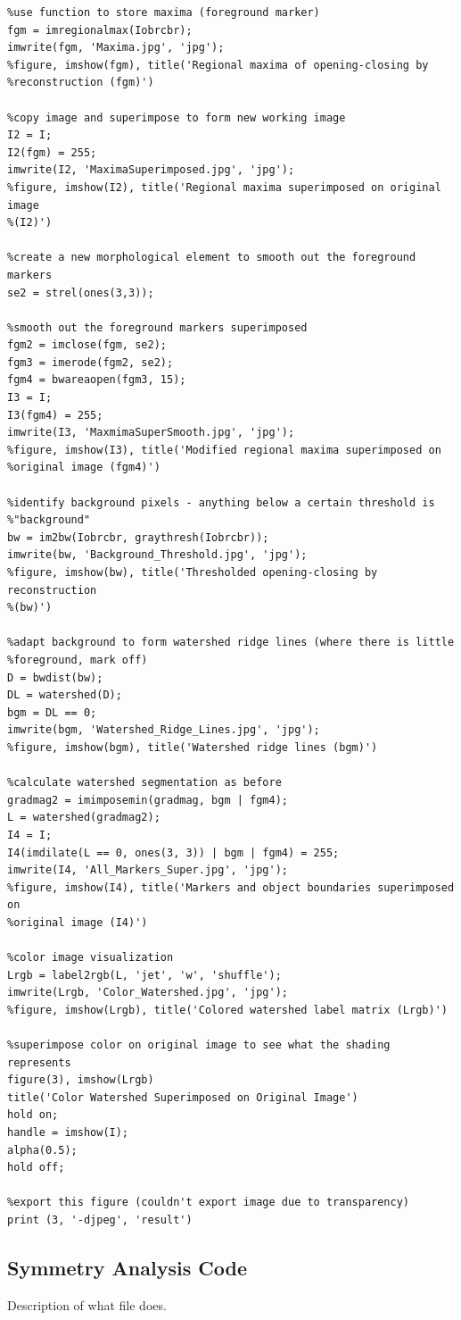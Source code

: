 \documentclass[12pt]{article}
\theoremstyle{plain}%
\theoremstyle{definition}
\theoremstyle{remark}
\begin{document}
\begin{verbatim}
%use function to store maxima (foreground marker)
fgm = imregionalmax(Iobrcbr);
imwrite(fgm, 'Maxima.jpg', 'jpg');
%figure, imshow(fgm), title('Regional maxima of opening-closing by
%reconstruction (fgm)')

%copy image and superimpose to form new working image
I2 = I;
I2(fgm) = 255;
imwrite(I2, 'MaximaSuperimposed.jpg', 'jpg');
%figure, imshow(I2), title('Regional maxima superimposed on original image
%(I2)')

%create a new morphological element to smooth out the foreground markers
se2 = strel(ones(3,3));

%smooth out the foreground markers superimposed
fgm2 = imclose(fgm, se2);
fgm3 = imerode(fgm2, se2);
fgm4 = bwareaopen(fgm3, 15);
I3 = I;
I3(fgm4) = 255;
imwrite(I3, 'MaxmimaSuperSmooth.jpg', 'jpg');
%figure, imshow(I3), title('Modified regional maxima superimposed on
%original image (fgm4)')

%identify background pixels - anything below a certain threshold is
%"background"
bw = im2bw(Iobrcbr, graythresh(Iobrcbr));
imwrite(bw, 'Background_Threshold.jpg', 'jpg');
%figure, imshow(bw), title('Thresholded opening-closing by reconstruction
%(bw)')

%adapt background to form watershed ridge lines (where there is little
%foreground, mark off)
D = bwdist(bw);
DL = watershed(D);
bgm = DL == 0;
imwrite(bgm, 'Watershed_Ridge_Lines.jpg', 'jpg');
%figure, imshow(bgm), title('Watershed ridge lines (bgm)')

%calculate watershed segmentation as before
gradmag2 = imimposemin(gradmag, bgm | fgm4);
L = watershed(gradmag2);
I4 = I;
I4(imdilate(L == 0, ones(3, 3)) | bgm | fgm4) = 255;
imwrite(I4, 'All_Markers_Super.jpg', 'jpg');
%figure, imshow(I4), title('Markers and object boundaries superimposed on
%original image (I4)')

%color image visualization
Lrgb = label2rgb(L, 'jet', 'w', 'shuffle');
imwrite(Lrgb, 'Color_Watershed.jpg', 'jpg');
%figure, imshow(Lrgb), title('Colored watershed label matrix (Lrgb)')

%superimpose color on original image to see what the shading represents
figure(3), imshow(Lrgb)
title('Color Watershed Superimposed on Original Image')
hold on;
handle = imshow(I);
alpha(0.5);
hold off;

%export this figure (couldn't export image due to transparency)
print (3, '-djpeg', 'result')
\end{verbatim}

\subsection{Symmetry Analysis Code}
Description of what file does.
\end{document}
